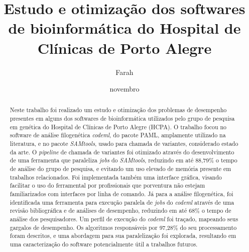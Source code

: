 \documentclass[cic,tc]{iiufrgs}
\title{Estudo e otimização dos softwares de bioinformática do Hospital de
Clínicas de Porto Alegre}
\author{Farah}{Alef}
\date{novembro}{2021}
\begin{document}
\sloppy

\maketitle



\begin{abstract}
  Neste trabalho foi realizado um estudo e otimização dos problemas de
  desempenho presentes em alguns dos softwares de bioinformática
  utilizados pelo grupo de pesquisa em genética do Hospital de Clínicas de
  Porto Alegre (HCPA). O trabalho focou no software de análise
  filogenética \textit{codeml}, do pacote PAML, amplamente utilizado na literatura, e no
  pacote \textit{SAMtools}, usado para chamada de variantes, considerado estado da arte.
  O \textit{pipeline} de chamada de variantes foi otimizado através do
  desenvolvimento de uma ferramenta que paraleliza \textit{jobs} do
  \textit{SAMtools}, reduzindo em até 88,79\% o tempo de análise do grupo de
  pesquisa, e evitando um uso elevado de memória presente em trabalhos
  relacionados. Foi implementada também uma interface gráfica, visando
  facilitar o uso do ferramental por profissionais que porventura não estejam
  familiarizados com interfaces por linha de comando.
  Já para a análise filogenética, foi identificada uma ferramenta para execução paralela de
  \textit{jobs} do \textit{codeml} através de uma revisão bibliográfica e de análises de
  desempenho, reduzindo em até 68\% o tempo de análise dos pesquisadores. Um
  perfil de execução do \textit{codeml} foi traçado, mapeando seus gargalos de
  desempenho. Os algoritmos responsáveis por 97,28\% do seu processamento foram
  descritos, e uma abordagem para sua paralelização foi explorada, resultando
  em uma caracterização do software potencialmente útil a trabalhos futuros.
\end{abstract}
\end{document}
